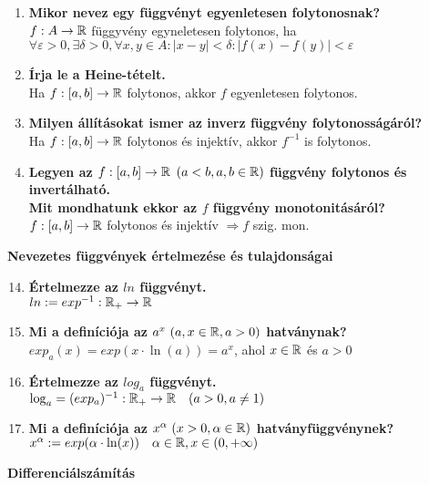 \documentclass[a4paper,11pt]{article}
\begin{document}
\begin{enumerate}
	\item \textbf{Mikor nevez egy függvényt egyenletesen folytonosnak?}\\[0.1cm]$f: A\to\mathbb{R}$ függyvény egyneletesen folytonos, ha \\[0.1cm] $\forall\varepsilon > 0, \exists\delta > 0, \forall x,y\in A: |x-y|<\delta : |f(x)-f(y)|<\varepsilon$
	\item \textbf{Írja le a Heine-tételt.}\\[0.1cm]Ha $f:[a,b]\to\mathbb{R}$ folytonos, akkor $f$ egyenletesen folytonos.
	\item \textbf{Milyen állításokat ismer az inverz függvény folytonosságáról?}\\[0.1cm]Ha $f:[a,b]\to\mathbb{R}$ folytonos és injektív, akkor $f^{-1}$ is folytonos.\newpage
	\item \textbf{Legyen az $f:[a,b]\to\mathbb{R}$ $(a<b,a,b\in\mathbb{R})$ függvény folytonos és invertálható.\\[0.1cm] Mit mondhatunk ekkor az $f$ függvény monotonitásáról?}\\[0.1cm]$f:[a,b]\to\mathbb{R}$ folytonos és injektív $\Rightarrow f$ szig. mon.\\
\end{enumerate}
\textbf{{\large Nevezetes függvények értelmezése és tulajdonságai}}
\begin{enumerate}
	\setcounter{enumi}{13}
	\item \textbf{Értelmezze az $ln$ függvényt.}\\[0.1cm] $ln:=exp^{-1}:\mathbb{R}_+\to\mathbb{R}$
	\item \textbf{Mi a definíciója az $a^x\text{  }(a,x\in\mathbb{R},a>0)$ hatványnak?}\\[0.1cm]$exp_a(x)=exp(x\cdot\ln(a))=a^x$, ahol $x\in\mathbb{R}$ és $a>0$
	\item \textbf{Értelmezze az $log_a$ függvényt.}\\[0.1cm] $\log_a=(exp_a)^{-1}:\mathbb{R}_+\to\mathbb{R}\quad(a>0,a\neq1)$
	\item \textbf{Mi a definíciója az $x^{\alpha}\text{  }(x>0,\alpha\in\mathbb{R})$ hatványfüggvénynek?}\\[0.1cm]$x^{\alpha}:=exp(\alpha\cdot\ln(x)) \quad\alpha\in\mathbb{R},x\in(0,+\infty)$
\end{enumerate}
\textbf{{\large Differenciálszámítás}}
\end{document}
